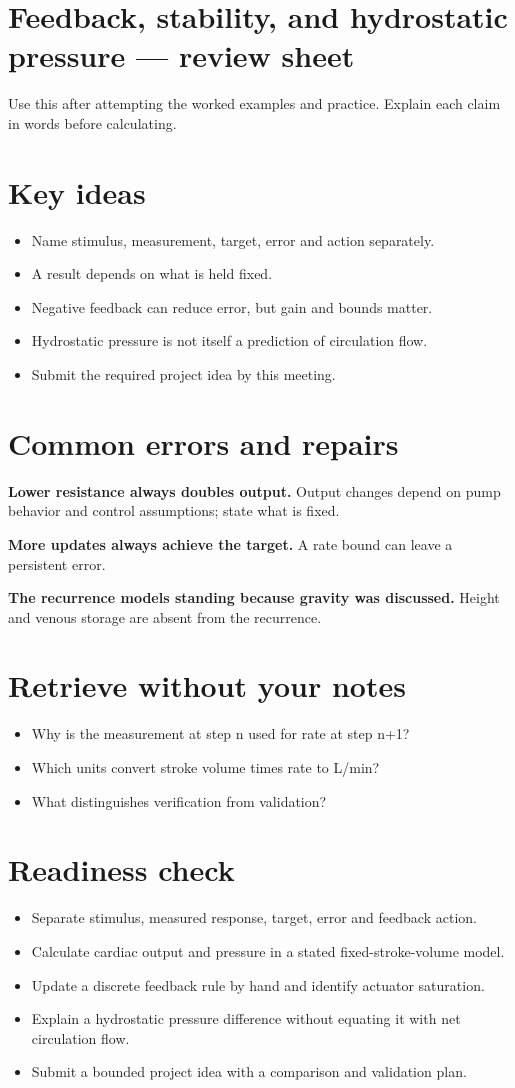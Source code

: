 \documentclass[11pt,letterpaper]{article}
\theoremstyle{definition}\newtheorem{definition}{Definition}\newtheorem{example}{Example}
\numberwithin{equation}{section}
\begin{document}
\section*{Feedback, stability, and hydrostatic pressure --- review sheet}
Use this after attempting the worked examples and practice. Explain each claim in words before calculating.

\section*{Key ideas}
\begin{itemize}
\item Name stimulus, measurement, target, error and action separately.
\item A result depends on what is held fixed.
\item Negative feedback can reduce error, but gain and bounds matter.
\item Hydrostatic pressure is not itself a prediction of circulation flow.
\item Submit the required project idea by this meeting.
\end{itemize}
\section*{Common errors and repairs}
\textbf{Lower resistance always doubles output.} Output changes depend on pump behavior and control assumptions; state what is fixed.

\textbf{More updates always achieve the target.} A rate bound can leave a persistent error.

\textbf{The recurrence models standing because gravity was discussed.} Height and venous storage are absent from the recurrence.

\section*{Retrieve without your notes}
\begin{itemize}
\item Why is the measurement at step n used for rate at step n+\allowbreak{}1?
\item Which units convert stroke volume times rate to L/min?
\item What distinguishes verification from validation?
\end{itemize}
\section*{Readiness check}
\begin{itemize}
\item Separate stimulus, measured response, target, error and feedback action.
\item Calculate cardiac output and pressure in a stated fixed-stroke-volume model.
\item Update a discrete feedback rule by hand and identify actuator saturation.
\item Explain a hydrostatic pressure difference without equating it with net circulation flow.
\item Submit a bounded project idea with a comparison and validation plan.
\end{itemize}
\end{document}
